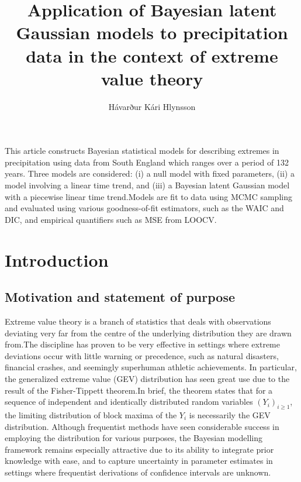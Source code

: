 \documentclass[12pt, a4paper]{article}
\title{Application of Bayesian latent Gaussian models to
       precipitation data in the context of extreme value theory}
\author{Hávarður Kári Hlynsson}
\date{}
\renewenvironment{abstract}
 {\small
  \begin{center}
  \bfseries \abstractname\vspace{-.5em}\vspace{0pt}
  \end{center}
  \list{}{%
    \setlength{\leftmargin}{20mm}
    \setlength{\rightmargin}{\leftmargin}%
  }%
  \item\relax}
 {\endlist}
\begin{document}
  
  \maketitle
  
  \begin{abstract}
    This article constructs Bayesian statistical models for describing extremes
    in precipitation using data from South England which ranges over a period
    of 132 years. Three models are considered: (i)
    a null model with fixed parameters, (ii) a model involving a linear time
    trend, and (iii) a Bayesian latent Gaussian model with a piecewise linear
    time trend.\@ Models are fit to data using MCMC sampling and evaluated
    using various goodness-of-fit estimators, such as the WAIC and DIC, and
    empirical quantifiers such as MSE from LOOCV.
  \end{abstract}

  \section{Introduction}
  \subsection{Motivation and statement of purpose}
  Extreme value theory is a branch of statistics that deals with observations
  deviating very far from the centre of the underlying distribution they are
  drawn from.\@ The discipline has proven to be very effective in settings 
  where extreme deviations occur with little warning or precedence, such as
  natural disasters, financial crashes, and seemingly superhuman athletic
  achievements. In particular, the generalized extreme value (GEV) distribution
  has seen great use due to the result of the Fisher-Tippett theorem.\@ In
  brief, the theorem states that for a sequence of independent and identically
  distributed random variables \((Y_i)_{i \geq 1}\), the limiting distribution
  of block maxima of the \(Y_i\) is necessarily the GEV distribution.\@
  Although frequentist methods have seen considerable success in employing the
  distribution for various purposes, the Bayesian modelling framework remains
  especially attractive due to its ability to integrate prior knowledge with
  ease, and to capture uncertainty in parameter estimates in settings where
  frequentist derivations of confidence intervals are unknown.
\end{document}
